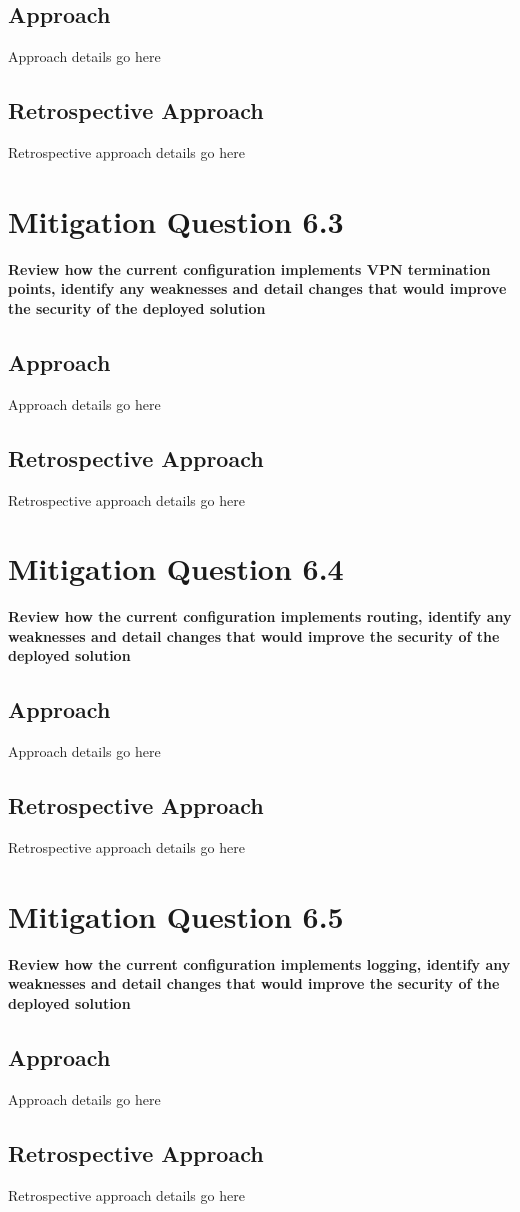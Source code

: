 \subsection{Approach}
Approach details go here
\subsection{Retrospective Approach}
Retrospective approach details go here

\section{Mitigation Question 6.3}
\textbf{Review how the current configuration implements VPN termination points,
identify any weaknesses and detail changes that would improve the security of
the deployed solution}
\subsection{Approach}
Approach details go here
\subsection{Retrospective Approach}
Retrospective approach details go here

\section{Mitigation Question 6.4}
\textbf{Review how the current configuration implements routing, identify any
weaknesses and detail changes that would improve the security of the deployed
solution}
\subsection{Approach}
Approach details go here
\subsection{Retrospective Approach}
Retrospective approach details go here

\section{Mitigation Question 6.5}
\textbf{Review how the current configuration implements logging, identify any
weaknesses and detail changes that would improve the security of the deployed
solution}
\subsection{Approach}
Approach details go here
\subsection{Retrospective Approach}
Retrospective approach details go here
